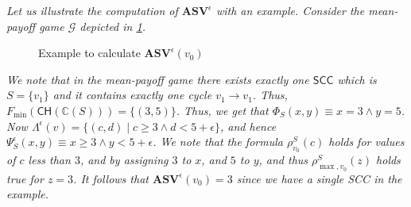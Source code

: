 \begin{example}
\label{Ex:CompASVTOR}
\emph{Let us illustrate the computation of $\mathbf{ASV}^{\epsilon}$ with an example. Consider the mean-payoff game $\mathcal{G}$ depicted in \cref{fig:ach_example}.}
\begin{figure}
    \centering
    \caption{Example to calculate $\mathbf{ASV}^{\epsilon}(v_0)$}
    \label{fig:ach_example}
\end{figure}
\emph{We note that in the mean-payoff game there exists exactly one $\mathsf{SCC}$ which is $S = \{v_1\}$ and it contains exactly one cycle $v_1 \to v_1$. Thus, $F_{\min}(\mathsf{CH}(\mathbb{C}(S))) = \{(3,5)\}$. 
Thus, we get that $\Phi_S(x,y) \equiv x = 3 \land y = 5 $. 
Now $ \Lambda^{\epsilon}(v) = \{(c,d) \mid c \geqslant 3 \land d < 5 + \epsilon \}$,
and hence $\Psi_S^{\epsilon}(x, y) \equiv x \geqslant 3 \land y < 5 + \epsilon$.
We note that the formula $\rho^S_{v_0}(c)$ holds for values of $c$ less than $3$, and by assigning $3$ to $x$, and $5$ to $y$, and thus $\rho^S_{\max,v_0}(z)$ holds true for $z=3$.
It follows that $\mathbf{ASV}^{\epsilon}(v_0) = 3$ since we have a single SCC in the example.
}
\end{example}

